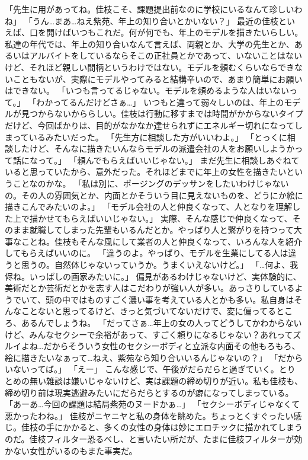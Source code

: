 「先生に用があってね。佳枝こそ、課題提出前なのに学校にいるなんて珍しいわね」
「うん…まあ…ねえ紫苑、年上の知り合いとかいない？」
最近の佳枝といえば、口を開けばいつもこれだ。何が何でも、年上のモデルを描きたいらしい。私達の年代では、年上の知り合いなんて言えば、両親とか、大学の先生とか、あるいはアルバイトをしているならそこの正社員とかであって、いないことはないけど、それほど親しい間柄というわけではない。モデルを頼むくらいならできないこともないが、実際にモデルやってみると結構辛いので、あまり簡単にお願いはできない。
「いつも言ってるじゃない。モデルを頼めるような人はいないって。」
「わかってるんだけどさぁ…」
いつもと違って弱々しいのは、年上のモデルが見つからないかららしい。佳枝は行動に移すまでは時間がかからないタイプだけど、今回ばかりは、目的がなかなか達せられずにエネルギー切れになってしまっているみたいだった。
「先生方に相談した方がいいわよ。」
「とっくに相談したけど、そんなに描きたいんならモデルの派遣会社の人をお願いしようかって話になって。」
「頼んでもらえばいいじゃない。」
まだ先生に相談しあぐねていると思っていたから、意外だった。それほどまでに年上の女性を描きたいということなのかな。
「私は別に、ポージングのデッサンをしたいわけじゃないの。その人の雰囲気とか、内面とかそういう目に見えないものを、どうにか絵に描きこんでみたいのよ。」
「モデル会社の人と仲良くなって、人となりを理解した上で描かせてもらえばいいじゃない。」
実際、そんな感じで仲良くなって、そのまま就職してしまった先輩もいるんだとか。やっぱり人と繋がりを持つって大事なことね。佳枝もそんな風にして業者の人と仲良くなって、いろんな人を紹介してもらえばいいのに。
「違うのよ。やっぱり、モデルを生業にしてる人は違うと思うの。自然体じゃないっていうか。うまくいえないけど。」
「…何よ、我侭ね。いっぱしの画家みたいに。」
偏見があるわけじゃないけど、実体験的に、美術だとか芸術だとかを志す人はこだわりが強い人が多い。あっさりしているようでいて、頭の中ではものすごく濃い事を考えている人とかも多い。私自身はそんなことないと思ってるけど、きっと気づいてないだけで、変に偏ってるところ、あるんでしょうね。
「だってさぁ…年上の女の人ってどうしてかわからないけど、みんなセクシーで余裕があって、すごく頼りになるじゃない？あれってズルイよね…だからそういう女性のセクシーボディと立派な内面その他もろもろ、絵に描きたいなぁって…ねえ、紫苑なら知り合いいるんじゃないの？」
「だからいないってば。」
「えー」
こんな感じで、午後がだらだらと過ぎていく。とりとめの無い雑談は嫌いじゃないけど、実は課題の締め切りが近い。私も佳枝も、締め切り前は現実逃避みたいにだらだらとするのが癖になってしまっている。
「あーあ…今回の課題は結局紫苑のヌードかぁ…」
「セクシーボディじゃなくて悪かったわね。」
佳枝がニヤニヤと私の身体を眺めた。ちょっとくすぐったい感じ。佳枝の手にかかると、多くの女性の身体は妙にエロチックに描かれてしまうのだ。佳枝フィルター恐るべし、と言いたい所だが、たまに佳枝フィルターが効かない女性がいるのもまた事実だ。
